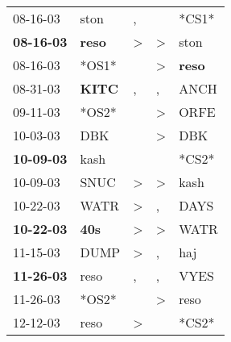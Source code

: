 \begin{supertabular}{p{0.07\textwidth}p{0.06\textwidth}p{0.02\textwidth}p{0.02\textwidth}p{0.06\textwidth}}
          08-16-03\textsuperscript{} &           ston\textsuperscript{} &                , &                  &                            *CS1* \\
 \textbf{08-16-03\textsuperscript{}} &  \textbf{reso\textsuperscript{}} &     \textgreater &     \textgreater &           ston\textsuperscript{} \\
          08-16-03\textsuperscript{} &                            *OS1* &                  &     \textgreater &  \textbf{reso\textsuperscript{}} \\
          08-31-03\textsuperscript{} &  \textbf{KITC\textsuperscript{}} &                , &                , &           ANCH\textsuperscript{} \\
          09-11-03\textsuperscript{} &                            *OS2* &                  &     \textgreater &           ORFE\textsuperscript{} \\
          10-03-03\textsuperscript{} &            DBK\textsuperscript{} &                  &     \textgreater &            DBK\textsuperscript{} \\
 \textbf{10-09-03\textsuperscript{}} &           kash\textsuperscript{} &                  &                  &                            *CS2* \\
          10-09-03\textsuperscript{} &           SNUC\textsuperscript{} &     \textgreater &     \textgreater &           kash\textsuperscript{} \\
          10-22-03\textsuperscript{} &           WATR\textsuperscript{} &     \textgreater &                , &           DAYS\textsuperscript{} \\
 \textbf{10-22-03\textsuperscript{}} &   \textbf{40s\textsuperscript{}} &     \textgreater &     \textgreater &           WATR\textsuperscript{} \\
          11-15-03\textsuperscript{} &           DUMP\textsuperscript{} &     \textgreater &                , &            haj\textsuperscript{} \\
 \textbf{11-26-03\textsuperscript{}} &           reso\textsuperscript{} &                , &                , &           VYES\textsuperscript{} \\
          11-26-03\textsuperscript{} &                            *OS2* &                  &     \textgreater &           reso\textsuperscript{} \\
          12-12-03\textsuperscript{} &           reso\textsuperscript{} &     \textgreater &                  &                            *CS2* \\

\end{supertabular}
